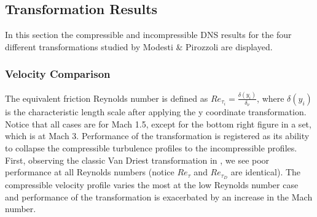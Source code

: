 \documentclass[12pt,a4paper,titlepage]{article}
\begin{document}
\subsection{Transformation Results}
In this section the compressible and incompressible DNS results for the four different transformations studied by Modesti \& Pirozzoli are displayed.
\subsubsection{Velocity Comparison}
 The equivalent friction Reynolds number is defined as $Re_{\tau_i} = \frac{\delta(y_i)}{\delta_\nu}$, where $\delta(y_i)$ is the characteristic length scale after applying the y coordinate transformation.  Notice that all cases are for Mach 1.5, except for the bottom right figure in a set, which is at Mach 3. Performance of the transformation is registered as its ability to collapse the compressible turbulence profiles to the incompressible profiles. First, observing the classic Van Driest transformation in , we see poor performance at all Reynolds numbers (notice $Re_\tau$ and $Re_{\tau_D}$ are identical). The compressible velocity profile varies the most at the low Reynolds number case and performance of the transformation is exacerbated by an increase in the Mach number. 
\end{document}

